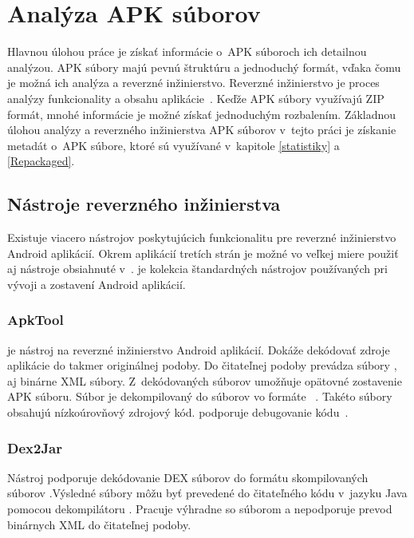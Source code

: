 \chapter{Analýza APK súborov}
\label{analyza}
Hlavnou úlohou práce je získať informácie o~APK súboroch ich detailnou analýzou. APK súbory majú pevnú štruktúru a jednoduchý formát, vďaka čomu je možná ich analýza a reverzné inžinierstvo. Reverzné inžinierstvo je proces analýzy funkcionality a obsahu aplikácie~\cite{reverse}. Keďže APK súbory využívajú ZIP formát, mnohé informácie je možné získať jednoduchým rozbalením. Základnou úlohou analýzy a reverzného inžinierstva APK súborov v~tejto práci je získanie metadát o~APK súbore, ktoré sú využívané v~kapitole \ref{statistiky} a \ref{Repackaged}.

\section{Nástroje reverzného inžinierstva}
\label{nastroje_revezneho_inzinierstva}

Existuje viacero nástrojov poskytujúcich funkcionalitu pre reverzné inžinierstvo Android aplikácií. Okrem aplikácií tretích strán je možné vo veľkej miere použiť aj nástroje obsiahnuté v~.  je kolekcia štandardných nástrojov používaných pri vývoji a zostavení Android aplikácií. 

\subsection{ApkTool}
\label{ApkTool}
 je nástroj na reverzné inžinierstvo Android aplikácií. Dokáže dekódovať zdroje aplikácie do takmer originálnej podoby. Do čitateľnej podoby prevádza súbory ,  aj binárne XML súbory. Z~dekódovaných súborov umožňuje opätovné zostavenie APK súboru. Súbor  je dekompilovaný do súborov vo formáte ~\cite{Nolan2012a}. Takéto súbory obsahujú nízkoúrovňový zdrojový kód.  podporuje debugovanie  kódu~\cite{apkTool}.

\subsection{Dex2Jar}
\label{Dex2Jar}
Nástroj  podporuje dekódovanie DEX súborov do formátu skompilovaných  súborov .Výsledné  súbory môžu byť prevedené do čitateľného kódu v~jazyku Java pomocou dekompilátoru . Pracuje výhradne so súborom  a nepodporuje prevod binárnych XML do čitateľnej podoby.

